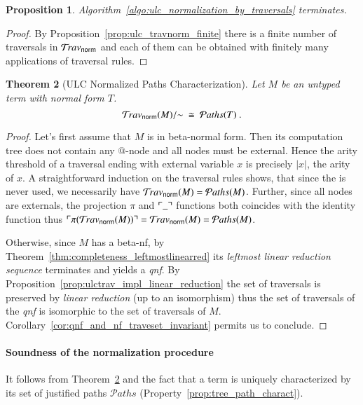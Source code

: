 \documentclass{elsarticle}
\theoremstyle{plain}
\newtheorem{theorem}{Theorem}[section]
\newtheorem{proposition}[theorem]{Proposition}
\theoremstyle{definition}
\theoremstyle{remark}
\newtheorem{remark}{Remark}[section]
\newcommand{\normalizing}{{\sf norm}}
\newcommand{\travsetnorm}{\travset_\normalizing}
\newcommand{\travulc}{\travset}
\def\coresymbol{\pi} %
\newcommand{\core}[1]{\coresymbol(#1)} %
\newcommand\pathset{{\mathcal{P}aths}} %
\begin{document}
\begin{proposition}
Algorithm~\ref{algo:ulc_normalization_by_traversals} terminates.
\end{proposition}
\begin{proof}
By Proposition~\ref{prop:ulc_travnorm_finite} there is a finite number of traversals in $\travsetnorm$ and each of them can be obtained with finitely many applications of traversal rules.
\end{proof}

\begin{theorem}[ULC Normalized Paths Characterization]
\label{thm:path_charact_ulc}
Let $M$ be an untyped term with normal form $T$.
$$\travsetnorm(M)/{\sim} \ \cong\ \pathset(T) \ .$$
\end{theorem}
\begin{proof}
Let's first assume that $M$ is in beta-normal form. Then its computation tree does not contain any $@$-node and all nodes must be external.
Hence the arity threshold of a traversal ending with external variable $x$ is precisely $|x|$, the arity of $x$. A straightforward induction on the traversal
rules shows, that since the  is never used, we necessarily have  $\travsetnorm(M) = \pathset(M)$. Further, since all nodes are externals, the projection $\coresymbol$ and $\ulcorner \_ \urcorner$ functions both coincides with the identity function thus $\pview{\core{\travsetnorm(M)}} = \travsetnorm(M) = \pathset(M)$.

Otherwise, since $M$ has a beta-nf, by Theorem~\ref{thm:completeness_leftmostlinearred} its \emph{leftmost linear reduction sequence} terminates and yields a \emph{qnf}. By Proposition~\ref{prop:ulctrav_impl_linear_reduction} the set of traversals is preserved by \emph{linear reduction} (up to an isomorphism) thus the set of traversals of the \emph{qnf} is isomorphic to the set of traversals of $M$. Corollary~\ref{cor:qnf_and_nf_traveset_invariant} permits us to conclude.
\end{proof}

\paragraph{Soundness of the normalization procedure} It follows from Theorem~\ref{thm:path_charact_ulc} and the fact that a term is uniquely characterized by its set of justified paths $\pathset$ (Property~\ref{prop:tree_path_charact}).

\end{document}
